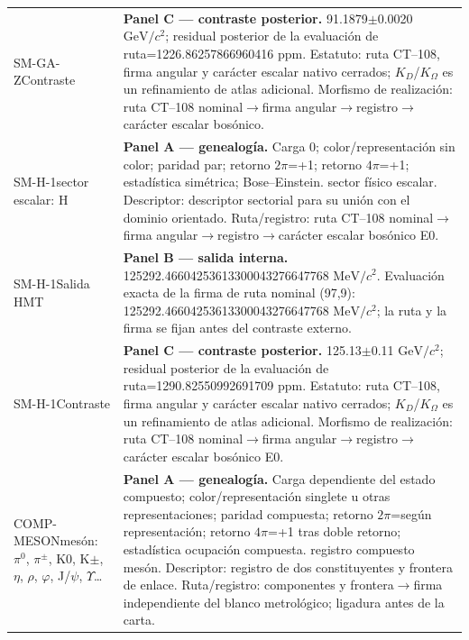 \begin{longtable}{@{}>{\raggedright\arraybackslash}p{2.55cm}>{\raggedright\arraybackslash}p{11.75cm}@{}}
SM-GA-Z\newline Contraste & \textbf{Panel C --- contraste posterior. }91.1879\(\pm\)0.0020 \(\mathrm{GeV}/c^2\); residual posterior de la evaluación de ruta=1226.86257866960416 ppm. Estatuto: ruta CT--108, firma angular y carácter escalar nativo cerrados; \(K_D\)/\(K_{\Omega}\) es un refinamiento de atlas adicional. Morfismo de realización: ruta CT--108 nominal\(\to\)\allowbreak{}firma angular\(\to\)\allowbreak{}registro\(\to\)\allowbreak{}carácter escalar bosónico. \\\addlinespace[2pt]
SM-H-1\newline sector escalar: H & \textbf{Panel A --- genealogía. }Carga 0; color/representación sin color; paridad par; retorno \(2\pi\)=+1; retorno \(4\pi\)=+1; estadística simétrica; Bose--Einstein. sector físico escalar. Descriptor: descriptor sectorial para su unión con el dominio orientado. Ruta/registro: ruta CT--108 nominal\(\to\)\allowbreak{}firma angular\(\to\)\allowbreak{}registro\(\to\)\allowbreak{}carácter escalar bosónico E0. \\
SM-H-1\newline Salida HMT & \textbf{Panel B --- salida interna. }125292.46604253613300043276647768 \(\mathrm{MeV}/c^2\). Evaluación exacta de la firma de ruta nominal (97,9): 125292.46604253613300043276647768 \(\mathrm{MeV}/c^2\); la ruta y la firma se fijan antes del contraste externo. \\
SM-H-1\newline Contraste & \textbf{Panel C --- contraste posterior. }125.13\(\pm\)0.11 \(\mathrm{GeV}/c^2\); residual posterior de la evaluación de ruta=1290.82550992691709 ppm. Estatuto: ruta CT--108, firma angular y carácter escalar nativo cerrados; \(K_D\)/\(K_{\Omega}\) es un refinamiento de atlas adicional. Morfismo de realización: ruta CT--108 nominal\(\to\)\allowbreak{}firma angular\(\to\)\allowbreak{}registro\(\to\)\allowbreak{}carácter escalar bosónico E0. \\\addlinespace[2pt]
COMP-MESON\newline mesón: \(\pi^0\), \(\pi^{\pm}\), K0, K\(\pm\), \(\eta\), \(\rho\), \(\varphi\), J/\(\psi\), \(\Upsilon\)\ldots{} & \textbf{Panel A --- genealogía. }Carga dependiente del estado compuesto; color/representación singlete u otras representaciones; paridad compuesta; retorno \(2\pi\)=según representación; retorno \(4\pi\)=+1 tras doble retorno; estadística ocupación compuesta. registro compuesto mesón. Descriptor: registro de dos constituyentes y frontera de enlace. Ruta/registro: componentes y frontera\(\to\)\allowbreak{}firma independiente del blanco metrológico; ligadura antes de la carta. \\

\end{longtable}
